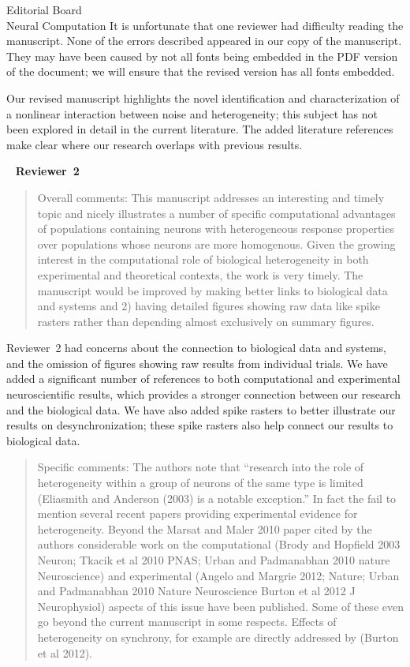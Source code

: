 \documentclass[]{letter}
\begin{document}
\begin{letter}{Editorial Board\\Neural Computation}
It is unfortunate that one reviewer had difficulty reading the manuscript. None of the errors described appeared in our copy of the manuscript. They may have been caused by not all fonts being embedded in the PDF version of the document; we will ensure that the revised version has all fonts embedded.

Our revised manuscript highlights the novel identification and characterization of a nonlinear interaction between noise and heterogeneity; this subject has not been explored in detail in the current literature. The added literature references make clear where our research overlaps with previous results.

\ \newline
{\large \bf Reviewer~2}
\begin{quotation}
  Overall comments: This manuscript addresses an interesting and timely topic and nicely illustrates a number of specific computational advantages of populations containing neurons with heterogeneous response properties over populations whose neurons are more homogenous. Given the growing interest in the computational role of biological heterogeneity in both experimental and theoretical contexts, the work is very timely.  The manuscript would be improved by making better links to biological data and systems and 2) having detailed figures showing raw data like spike rasters rather than depending almost exclusively on summary figures.
\end{quotation}

Reviewer~2 had concerns about the connection to biological data and systems, and the omission of figures showing raw results from individual trials. We have added a significant number of references to both computational and experimental neuroscientific results, which provides a stronger connection between our research and the biological data. We have also added spike rasters to better illustrate our results on desynchronization; these spike rasters also help connect our results to biological data.

\begin{quotation}
  Specific comments:
  The authors note that ``research into the role of heterogeneity within a group of neurons of the same type is limited (Eliasmith and Anderson (2003) is a notable exception.''  In fact the fail to mention several recent papers providing experimental evidence for heterogeneity.  Beyond the Marsat and Maler 2010 paper cited by the authors considerable work on the computational (Brody and Hopfield 2003 Neuron;  Tkacik et al 2010 PNAS; Urban and Padmanabhan 2010 nature Neuroscience) and experimental (Angelo and Margrie 2012; Nature; Urban and Padmanabhan 2010 Nature Neuroscience  Burton et al 2012 J Neurophysiol) aspects of this issue have been published.  Some of these even go beyond the current manuscript in some respects.  Effects of heterogeneity on synchrony, for example are directly addressed by (Burton et al 2012).
\end{quotation}


\end{letter}
\end{document}
